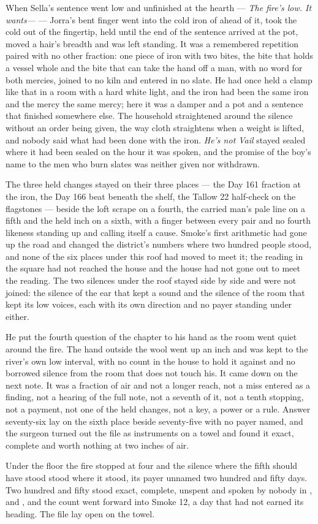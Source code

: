 When Sella's sentence went low and unfinished at the hearth --- \emph{The fire's low. It wants---} --- Jorra's bent finger went into the cold iron of  ahead of it, took the cold out of the fingertip, held until the end of the sentence arrived at the pot, moved a hair's breadth and was left standing. It was a remembered repetition paired with no other fraction: one piece of iron with two bites, the bite that holds a vessel whole and the bite that can take the hand off a man, with no  word for both mercies, joined to no kiln and entered in no slate. He had once held a clamp like that in a room with a hard white light, and the iron had been the same iron and the mercy the same mercy; here it was a damper and a pot and a sentence that finished somewhere else. The household straightened around the silence without an order being given, the way cloth straightens when a weight is lifted, and nobody said what had been done with the iron. \emph{He's not Vail} stayed sealed where it had been sealed on the hour it was spoken, and the promise of the boy's name to the men who burn slates was neither given nor withdrawn.

The three held changes stayed on their three places --- the Day 161 fraction at the iron, the Day 166 beat beneath the shelf, the Tallow 22 half-check on the flagstones --- beside the loft scrape on a fourth, the carried man's pale line on a fifth and the held inch on a sixth, with a finger between every pair and no fourth likeness standing up and calling itself a cause. Smoke's first arithmetic had gone up the road and changed the district's numbers where two hundred people stood, and none of the six places under this roof had moved to meet it; the reading in the square had not reached the house and the house had not gone out to meet the reading. The two silences under the roof stayed side by side and were not joined: the silence of the ear that kept a sound and the silence of the room that kept its low voices, each with its own direction and no payer standing under either.

He put the fourth question of the chapter to his hand as the room went quiet around the fire. The hand outside the wool went up an inch and was kept to the river's own low interval, with no count in the house to hold it against and no borrowed silence from the room that does not touch his. It came down on the next note. It was a fraction of air and not a longer reach, not a miss entered as a finding, not a hearing of the full note, not a seventh of it, not a tenth stopping, not a payment, not one of the held changes, not a key, a power or a rule. Answer seventy-six lay on the sixth place beside seventy-five with no payer named, and the surgeon turned out the file as instruments on a towel and found it exact, complete and worth nothing at two inches of air.

Under the floor the fire stopped at four and the silence where the fifth should have stood stood where it stood, its payer unnamed two hundred and fifty days. Two hundred and fifty stood exact, complete, unspent and spoken by nobody in ,  and , and the count went forward into Smoke 12, a day that had not earned its heading. The file lay open on the towel.
